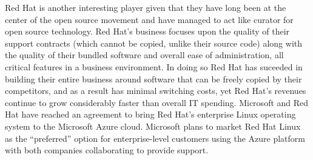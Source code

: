 
Red Hat is another interesting player given that they have long been at the center of the open source movement and have managed to act like curator for open source technology.\autocite[]{OptimismInnovation}
Red Hat's business focuses upon the quality of their support contracts (which cannot be copied, unlike their source code) along with the quality of their bundled software and overall ease of administration, all critical features in a business environment.
In doing so Red Hat has suceeded in building their entire business around software that can be freely copied by their competitors, and as a result has minimal switching costs, yet Red Hat's revenues continue to grow considerably faster than overall IT spending.\autocite[]{OptimismInnovation}
Microsoft and Red Hat have reached an agreement to bring Red Hat's enterprise Linux operating system to the Microsoft Azure cloud.\autocite[]{MSRHTDeal}
Microsoft plans to market Red Hat Linux as the ``preferred'' option for enterprise-level customers using the Azure platform with both companies collaborating to provide support.\autocite[]{MSRHTDeal}



